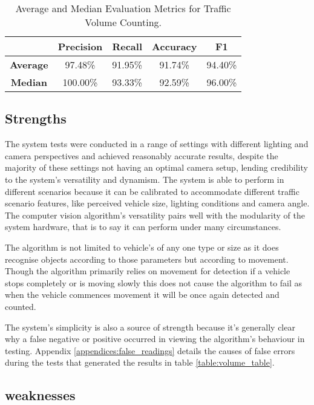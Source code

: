 \begin{table}[H]
\centering
\begin{tabular}{|ccccc|}
    \hline
                    &\textbf{Precision}&\textbf{Recall}&\textbf{Accuracy}&\textbf{F1}\\\hline
    \textbf{Average}&97.48\%&91.95\%&91.74\%&94.40\%\\\hline
    \textbf{Median}&100.00\%&93.33\%&92.59\%&96.00\%\\\hline
\end{tabular}
\caption{Average and Median Evaluation Metrics for Traffic Volume Counting.}
\label{table:averages}
\end{table}

\subsection{Strengths}

The system tests were conducted in a range of settings with different lighting and camera perspectives and achieved reasonably accurate results, despite the majority of these settings not having an optimal camera setup, lending credibility to the system's versatility and dynamism. The system is able to perform in different scenarios because it can be calibrated to accommodate different traffic scenario features, like perceived vehicle size, lighting conditions and camera angle. The computer vision algorithm's versatility pairs well with the modularity of the system hardware, that is to say it can perform under many circumstances. 

The algorithm is not limited to vehicle's of any one type or size as it does recognise objects according to those parameters but according to movement. Though the algorithm primarily relies on movement for detection if a vehicle stops completely or is moving slowly this does not cause the algorithm to fail as when the vehicle commences movement it will be once again detected and counted. 

The system's simplicity is also a source of strength because it's generally clear why a false negative or positive occurred in viewing the algorithm's behaviour in testing. Appendix \ref{appendices:false_readings} details the causes of false errors during the tests that generated the results in table \ref{table:volume_table}.  

\subsection{weaknesses}

